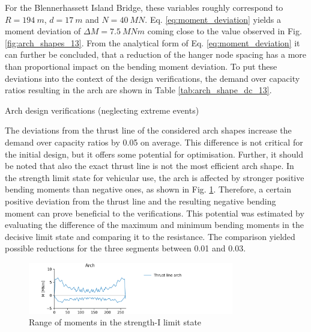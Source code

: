 For the Blennerhassett Island Bridge, these variables roughly correspond to $R=\SI{194}{m}$, $d=\SI{17}{m}$ and $N=\SI{40}{MN}$. Eq. \eqref{eq:moment_deviation} yields a moment deviation of $\Delta M=\SI{7.5}{MNm}$ coming close to the value observed in Fig. \ref{fig:arch_shapes_13}. From the analytical form of Eq. \eqref{eq:moment_deviation} it can further be concluded, that a reduction of the hanger node spacing has a more than proportional impact on the bending moment deviation. To put these deviations into the context of the design verifications, the demand over capacity ratios resulting in the arch are shown in Table \ref{tab:arch_shape_dc_13}.

\begin{table}[H]
    \centering
    
    \caption{Arch design verifications (neglecting extreme events)}
    \label{tab:arch_shape_dc_13}
\end{table}

The deviations from the thrust line of the considered arch shapes increase the demand over capacity ratios by 0.05 on average. This difference is not critical for the initial design, but it offers some potential for optimisation. Further, it should be noted that also the exact thrust line is not the most efficient arch shape. In the strength limit state for vehicular use, the arch is affected by stronger positive bending moments than negative ones, as shown in Fig. \ref{fig:arch_shape_strength_1}. Therefore, a certain positive deviation from the thrust line and the resulting negative bending moment can prove beneficial to the verifications. This potential was estimated by evaluating the difference of the maximum and minimum bending moments in the decisive limit state and comparing it to the resistance. The comparison yielded possible reductions for the three segments between 0.01 and 0.03.

\begin{figure}[H]
    \centering
    \includegraphics[trim={0 0 2cm 0},clip, width=0.8\textwidth]{calculations/arch shape/strength-I_13.png}
    \caption{Range of moments in the strength-I limit state}
    \label{fig:arch_shape_strength_1}
\end{figure}

